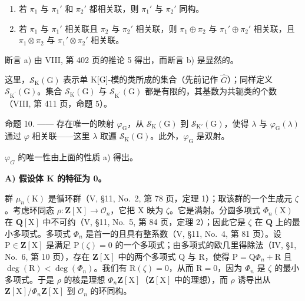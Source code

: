 \begin{enumerate}
\def\labelenumi{\alph{enumi})}
\item
  若 \(\pi_1\) 与 \(\pi_1'\) 和 \(\pi_2'\) 都相关联，则 \(\pi_1'\) 与 \(\pi_2'\) 同构。
\item
  若 \(\pi_1\) 与 \(\pi_1'\) 相关联且 \(\pi_2\) 与 \(\pi_2'\) 相关联，则 \(\pi_1 \oplus \pi_2\) 与 \(\pi_1' \oplus \pi_2'\) 相关联，且 \(\pi_1 \otimes \pi_2\) 与 \(\pi_1' \otimes \pi_2'\) 相关联。
\end{enumerate}

断言 a) 由 VIII, 第 402 页的推论 5 得出，而断言 b) 是显然的。

这里，\(\mathcal{S}_{\mathrm{K}}(\mathrm{G})\) 表示单 K{[}G{]}-模的类所成的集合（先前记作 \(\widehat{G}\)）；同样定义 \(\mathcal{S}_{\mathrm{K}^{\prime}}(\mathrm{G})\)。集合 \(\mathcal{S}_{\mathrm{K}}(\mathrm{G})\) 与 \(\mathcal{S}_{\mathrm{K}^{\prime}}(\mathrm{G})\) 都是有限的，其基数为共轭类的个数（VIII, 第 411 页，命题 5）。

命题 10. —— 存在唯一的映射 \(\varphi_{\mathrm{G}}\)，从 \(\mathcal{S}_{\mathrm{K}}(\mathrm{G})\) 到 \(\mathcal{S}_{\mathrm{K}'}(\mathrm{G})\)，使得 \(\lambda\) 与 \(\varphi_{\mathrm{G}}(\lambda)\) 通过 \(\varphi\) 相关联——这里 \(\lambda\) 取遍 \(\mathcal{S}_{\mathrm{K}}(\mathrm{G})\)。此外，\(\varphi_{\mathrm{G}}\) 是双射。

\(\varphi_{G}\) 的唯一性由上面的性质 a) 得出。

\textbf{A) 假设体 K 的特征为 0。}

群 \(\mu_n(\mathrm{K})\) 是循环群（V, §11, No.~2, 第 78 页，定理 1）；取该群的一个生成元 \(\zeta\)。考虑环同态 \(\rho: \mathbf{Z}[\mathrm{X}] \to \mathcal{O}_n\)，它把 X 映为 \(\zeta\)。它是满射。分圆多项式 \(\Phi_n(\mathrm{X})\) 在 \(\mathbf{Q}[\mathrm{X}]\) 中不可约（V, §11, No.~5, 第 84 页，定理 2）；因此它是 \(\zeta\) 在 \(\mathbf{Q}\) 上的最小多项式。多项式 \(\Phi_n\) 是首一的且具有整系数（V, §11, No.~4, 第 81 页）。设 \(\mathrm{P} \in \mathbf{Z}[\mathrm{X}]\) 是满足 \(\mathrm{P}(\zeta) = 0\) 的一个多项式；由多项式的欧几里得除法（IV, §1, No.~6, 第 10 页），存在 \(\mathbf{Z}[\mathrm{X}]\) 中的两个多项式 Q 与 R，使得 \(\mathrm{P} = \mathrm{Q}\Phi_n + \mathrm{R}\) 且 \(\deg(\mathrm{R}) < \deg(\Phi_n)\)。我们有 \(\mathrm{R}(\zeta) = 0\)，从而 \(\mathrm{R} = 0\)，因为 \(\Phi_n\) 是 \(\zeta\) 的最小多项式。于是 \(\rho\) 的核是理想 \(\Phi_n\mathbf{Z}[\mathrm{X}]\)（\(\mathbf{Z}[\mathrm{X}]\) 中的理想），而 \(\rho\) 诱导出从 \(\mathbf{Z}[\mathrm{X}] / \Phi_n\mathbf{Z}[\mathrm{X}]\) 到 \(\mathcal{O}_n\) 的环同构。

